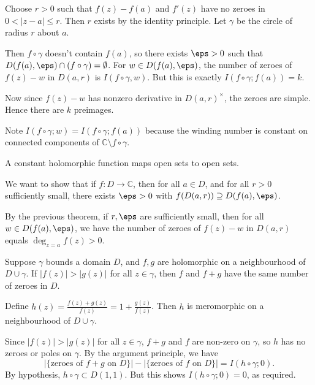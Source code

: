 \documentclass[12pt]{article}
\begin{document}
\begin{proofbox}
	Choose $r > 0$ such that $f(z) - f(a)$ and $f'(z)$ have no zeroes in $0 < |z-a|\le r$. Then $r$ exists by the identity principle. Let $\gamma$ be the circle of radius $r$ about $a$.

	Then $f \circ \gamma$ doesn't contain $f(a)$, so there exists $\eps > 0$ such that $D(f(a), \eps) \cap (f \circ \gamma) = \emptyset$. For $w \in D(f(a), \eps)$, the number of zeroes of $f(z) - w$ in $D(a, r)$ is $I(f \circ \gamma, w)$. But this is exactly $I(f\circ\gamma; f(a)) = k$.

	Now since $f(z) - w$ has nonzero derivative in $D(a, r)^{\times}$, the zeroes are simple. Hence there are $k$ preimages.
\end{proofbox}

Note $I(f \circ \gamma; w) = I(f \circ \gamma; f(a))$ because the winding number is constant on connected components of  $\mathbb{C} \setminus f \circ \gamma$.

\begin{corollary}
	A constant holomorphic function maps open sets to open sets.
\end{corollary}

\begin{proofbox}
	We want to show that if $f : D \to \mathbb{C}$, then for all $a \in D$, and for all $r > 0$ sufficiently small, there exists $\eps > 0$ with $f(D(a, r)) \supseteq D(f(a), \eps)$.

	By the previous theorem, if $r, \eps$ are sufficiently small, then for all $w \in D(f(a), \eps)$, we have the number of zeroes of $f(z) - w$ in $D(a, r)$ equals $\deg_{z=a} f(z) > 0$.
\end{proofbox}

\begin{theorem}
	Suppose $\gamma$ bounds a domain $D$, and $f, g$ are holomorphic on a neighbourhood of $D \cup \gamma$. If $|f(z)| > |g(z)|$ for all $z \in \gamma$, then $f$ and $f + g$ have the same number of zeroes in $D$.
\end{theorem}

\begin{proofbox}
	Define $h(z) = \frac{f(z) + g(z)}{f(z)} = 1 + \frac{g(z)}{f(z)}$. Then $h$ is meromorphic on a neighbourhood of $D \cup \gamma$.

	Since $|f(z)| > |g(z)|$ for all $z \in \gamma$, $f + g$ and $f$ are non-zero on $\gamma$, so $h$ has no zeroes or poles on $\gamma$. By the argument principle, we have
	\[
		|\{\text{zeroes of } f + g \text{ on } D\}| - |\{\text{zeroes of } f \text{ on } D\}| = I(h \circ \gamma; 0).
	\]
	By hypothesis, $h \circ \gamma \subset D(1, 1)$. But this shows $I(h \circ \gamma; 0) = 0$, as required.
\end{proofbox}
\end{document}
